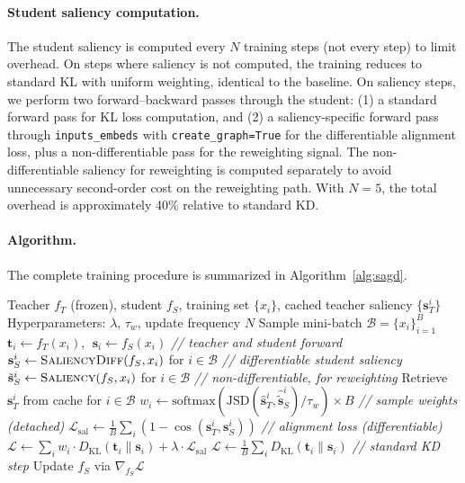 \paragraph{Student saliency computation.}
The student saliency is computed every $N$ training steps (not every step) to limit overhead. On steps where saliency is not computed, the training reduces to standard KL with uniform weighting, identical to the baseline.
On saliency steps, we perform two forward--backward passes through the student:
(1) a standard forward pass for KL loss computation, and
(2) a saliency-specific forward pass through \texttt{inputs\_embeds} with \texttt{create\_graph=True} for the differentiable alignment loss, plus a non-differentiable pass for the reweighting signal.
The non-differentiable saliency for reweighting is computed separately to avoid unnecessary second-order cost on the reweighting path.
With $N = 5$, the total overhead is approximately 40\% relative to standard KD.

\paragraph{Algorithm.}
The complete training procedure is summarized in Algorithm~\ref{alg:sagd}.

\begin{algorithm}[t]
\caption{SaGD Training}\label{alg:sagd}
\begin{algorithmic}[1]
\REQUIRE Teacher $f_T$ (frozen), student $f_S$, training set $\{x_i\}$, cached teacher saliency $\{\mathbf{s}_T^i\}$
\REQUIRE Hyperparameters: $\lambda$, $\tau_w$, update frequency $N$
    \STATE Sample mini-batch $\mathcal{B} = \{x_i\}_{i=1}^B$
    \STATE $\mathbf{t}_i \leftarrow f_T(x_i)$, $\;\mathbf{s}_i \leftarrow f_S(x_i)$ \hfill \textit{// teacher and student forward}
        \STATE $\mathbf{s}_S^i \leftarrow \textsc{SaliencyDiff}(f_S, x_i)$ for $i \in \mathcal{B}$ \hfill \textit{// differentiable student saliency}
        \STATE $\tilde{\mathbf{s}}_S^i \leftarrow \textsc{Saliency}(f_S, x_i)$ for $i \in \mathcal{B}$ \hfill \textit{// non-differentiable, for reweighting}
        \STATE Retrieve $\mathbf{s}_T^i$ from cache for $i \in \mathcal{B}$
        \STATE $w_i \leftarrow \mathrm{softmax}\!\left(\mathrm{JSD}(\hat{\mathbf{s}}_T^i, \hat{\tilde{\mathbf{s}}}_S^i) / \tau_w\right) \times B$ \hfill \textit{// sample weights (detached)}
        \STATE $\mathcal{L}_\mathrm{sal} \leftarrow \frac{1}{B}\sum_{i} (1 - \cos(\mathbf{s}_T^i, \mathbf{s}_S^i))$ \hfill \textit{// alignment loss (differentiable)}
        \STATE $\mathcal{L} \leftarrow \sum_i w_i \cdot D_\mathrm{KL}(\mathbf{t}_i \| \mathbf{s}_i) + \lambda \cdot \mathcal{L}_\mathrm{sal}$
    \ELSE
        \STATE $\mathcal{L} \leftarrow \frac{1}{B}\sum_i D_\mathrm{KL}(\mathbf{t}_i \| \mathbf{s}_i)$ \hfill \textit{// standard KD step}
    \ENDIF
    \STATE Update $f_S$ via $\nabla_{f_S} \mathcal{L}$
\ENDFOR
\end{algorithmic}
\end{algorithm}


